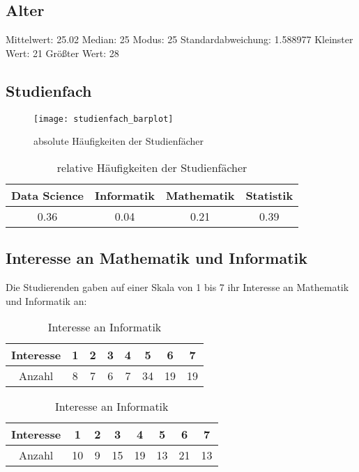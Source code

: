 \documentclass[paper=a4,                 %
               fontsize=12pt,            %
               parskip=half,             %
               ngerman,                 %
               ]{scrartcl}
\begin{document}
\subsection{Alter}
Mittelwert: 25.02 \newline
Median:  25 \newline
Modus:  25 \newline
Standardabweichung:  1.588977 \newline
Kleinster Wert:  21 \newline
Größter Wert:  28 

\newpage
\subsection{Studienfach}
 \begin{figure}[h]
 	\begin{center}
 		\texttt{[image: studienfach\_barplot]}
 	\end{center}
  \caption{absolute Häufigkeiten der Studienfächer}
 \end{figure} 
 

\begin{table}[h]
\begin{center}
\begin{tabular}{c|c|c|c}
Data Science & Informatik & Mathematik & Statistik \\
\hline
0.36 & 0.04 & 0.21 & 0.39 \\
\end{tabular}
\end{center}
\caption{relative Häufigkeiten der Studienfächer}
\end{table}

\newpage
\subsection{Interesse an Mathematik und Informatik}
Die Studierenden gaben auf einer Skala von 1 bis 7 ihr Interesse an Mathematik und Informatik an: 

\begin{table}[h]
\begin{minipage}[b]{.5\linewidth}
	\begin{center}
\begin{tabular}{c||c|c|c|c|c|c|c}
Interesse & 1 & 2 & 3 & 4 & 5 & 6 & 7 \\
\hline
Anzahl & 8 & 7 & 6 & 7 & 34 & 19 & 19 \\
\end{tabular}
\end{center}
\caption{Interesse an Mathe}
\end{minipage}
\begin{minipage}[b]{.5\linewidth}
\begin{center}
\begin{tabular}{c||c|c|c|c|c|c|c}
Interesse & 1 & 2 & 3 & 4 & 5 & 6 & 7 \\
\hline
Anzahl & 10 & 9 &15 &19& 13& 21& 13 \\
\end{tabular}
\end{center}
\caption{Interesse an Informatik}
\end{minipage}
\end{table}
\end{document}
